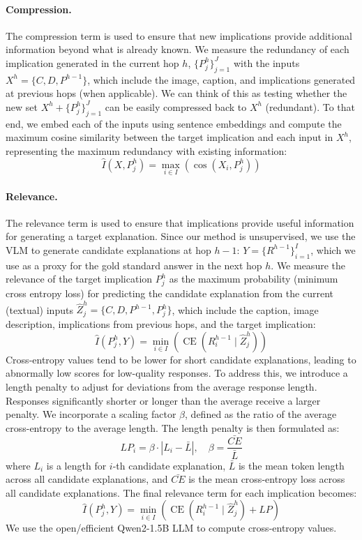 \paragraph{Compression.} 

The compression term is used to ensure that new implications provide additional information beyond what is already known. We measure the redundancy of each implication generated in the current hop $h$, $\{P_j^{h}\}_{j=1}^J$ with the inputs $X^h = \{C, D, P^{h-1}\}$, which include the image, caption, and implications generated at previous hops (when applicable). We can think of this as testing whether the new set $X^h + \{P_j^{h}\}_{j=1}^J$ can be easily compressed back to $X^h$ (redundant). To that end, we embed each of the inputs using sentence embeddings and compute the maximum cosine similarity between the target implication and each input in $X^h$, representing the maximum redundancy with existing information:
\[
\hat{I}(X, P_{j}^{h}) = \max_{i\in I}(\operatorname{cos}(X_{i}, P_{j}^{h}))
\]

\paragraph{Relevance.} The relevance term is used to ensure that implications provide useful information for generating a target explanation. Since our method is unsupervised, we use the VLM to generate candidate explanations at hop $h-1$: $Y = \{R^{h-1}\}_{i=1}^I$, which we use as a proxy for the gold standard answer in the next hop $h$. We measure the relevance of the target implication $P_j^{h}$ as the maximum probability (minimum cross entropy loss) for predicting the candidate explanation from the current (textual) inputs 
$\hat{Z}_j^{h} = \{C, D, P^{h-1}, P_j^{h}\}$, which include the caption, image description,  implications from previous hops, and the target 
implication: 
\[
\hat{I}(P_{j}^{h}, Y) = \min_{i \in I} (\operatorname{CE}(R_i^{h-1} \mid \hat{Z}_j^{h}))
\]
Cross-entropy values tend to be lower for short candidate explanations, leading to abnormally low scores for low-quality responses. To address this, we introduce a length penalty to adjust for deviations from the average response length. Responses significantly shorter or longer than the average receive a larger penalty.
We incorporate a scaling factor $\beta$, defined as the ratio of the average cross-entropy to the average length. The length penalty is then formulated as:
\[
LP_i = \beta \cdot |L_i - \bar{L}|, \quad \beta = \frac{\bar{CE}}{\bar{L}}
\]
\noindent where $L_i$ is a length for $i$-th candidate explanation, $\bar{L}$ is the mean token length across all candidate explanations, and $\bar{CE}$ is the mean cross-entropy loss across all candidate explanations.
The final relevance term for each implication becomes:
\[
\hat{I}(P_{j}^{h}, Y) = \min_{i \in I} (\operatorname{CE}(R_i^{h-1} \mid \hat{Z}_j^{h}) + LP)
\]
We use the open/efficient Qwen2-1.5B \cite{yang2024qwen2technicalreport} LLM to compute cross-entropy values.

